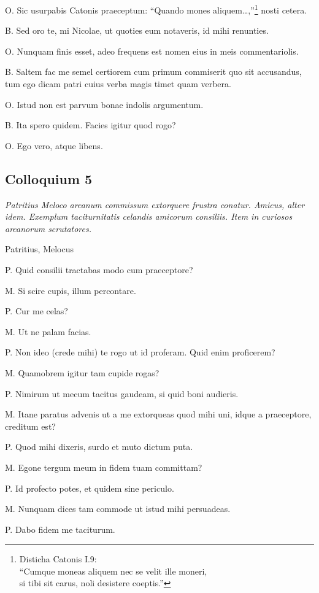 \documentclass{article}
\begin{document}
O. Sic usurpabis Catonis praeceptum: ``Quando mones aliquem\ldots,''\footnote{Disticha Catonis I.9:\\ ``Cumque moneas aliquem nec se velit ille moneri,\\si tibi sit carus, noli desistere coeptis.''} nosti cetera.

B. Sed oro te, mi Nicolae, ut quoties eum notaveris, id mihi renunties.

 
O. Nunquam finis esset, adeo frequens est nomen eius in meis commentariolis.

B. Saltem fac me semel certiorem cum primum commiserit quo sit accusandus, tum ego dicam patri cuius verba magis timet quam verbera.

O. Istud non est parvum bonae indolis argumentum.

B. Ita spero quidem. Facies igitur quod rogo?

O. Ego vero, atque libens.

\subsection{Colloquium 5}
\emph{Patritius Meloco arcanum commissum extorquere frustra conatur. Amicus, alter idem. Exemplum taciturnitatis celandis amicorum consiliis. Item in curiosos arcanorum scrutatores.}

Patritius, Melocus

P. Quid consilii tractabas modo cum praeceptore?

M. Si scire cupis, illum percontare.

P. Cur me celas?

M. Ut ne palam facias.

P. Non ideo (crede mihi) te rogo ut id proferam. Quid enim proficerem?

M. Quamobrem igitur tam cupide rogas?

P. Nimirum ut mecum tacitus gaudeam, si quid boni audieris.

M. Itane paratus advenis ut a me extorqueas quod mihi uni, idque a praeceptore, creditum est?

P. Quod mihi dixeris, surdo et muto dictum puta.

M. Egone tergum meum in fidem tuam committam?

P. Id profecto potes, et quidem sine periculo.

M. Nunquam dices tam commode ut istud mihi persuadeas.

P. Dabo fidem me taciturum.
\end{document}
